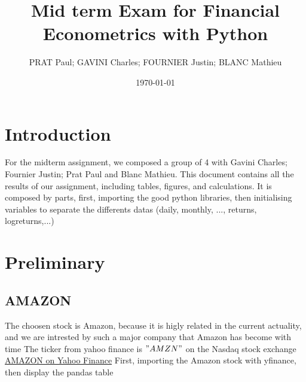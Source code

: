 \documentclass{article}
\begin{document}
\title{Mid term Exam for Financial Econometrics with Python}
\author{PRAT Paul; GAVINI Charles; FOURNIER Justin; BLANC Mathieu}
\date{\today}

\maketitle %

\tableofcontents %

\section{Introduction}
For the midterm assignment, we composed a group of 4 with Gavini Charles; Fournier Justin; Prat Paul and Blanc Mathieu. 
This document contains all the results of our assignment, including tables, figures, and calculations. 
It is composed by  parts, first, importing the good python libraries,
then initialising variables to separate the differents datas (daily, monthly, ..., returns, logreturns,...)


\section{Preliminary}


\subsection{AMAZON}

The choosen stock is Amazon, because it is higly related in the current actuality, and we are intrested by such a major company that Amazon has become with time
The ticker from yahoo finance is $"AMZN"$ on the Nasdaq stock exchange \href{https://finance.yahoo.com/quote/AMZN/.}{AMAZON on Yahoo Finance}
First, importing the Amazon stock with yfinance, then display the pandas table
\end{document}
